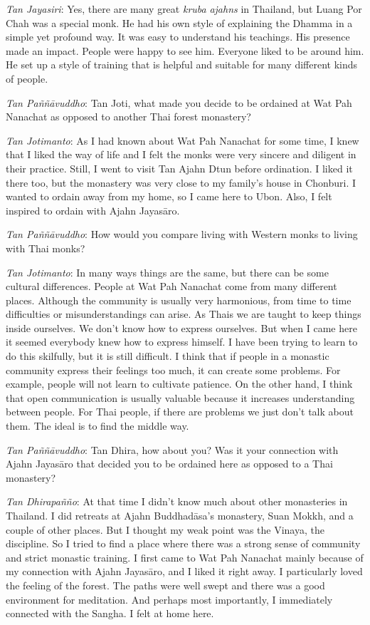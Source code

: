 \emph{Tan Jayasiri}: Yes, there are many great \emph{kruba}
\emph{ajahns} in Thailand, but Luang Por Chah was a special monk. He had
his own style of explaining the Dhamma in a simple yet profound way. It
was easy to understand his teachings. His presence made an impact.
People were happy to see him. Everyone liked to be around him. He set up
a style of training that is helpful and suitable for many different
kinds of people.

\emph{Tan Paññāvuddho}‎: Tan Joti, what made you decide to be ordained
at Wat Pah Nanachat as opposed to another Thai forest monastery?

\emph{Tan Jotimanto}: As I had known about Wat Pah Nanachat for some
time, I knew that I liked the way of life and I felt the monks were very
sincere and diligent in their practice. Still, I went to visit Tan Ajahn
Dtun before ordination. I liked it there too, but the monastery was very
close to my family's house in Chonburi. I wanted to ordain away from my
home, so I came here to Ubon. Also, I felt inspired to ordain with Ajahn
Jayasāro.

\emph{Tan Paññāvuddho}‎: How would you compare living with Western monks
to living with Thai monks?

\emph{Tan Jotimanto}: In many ways things are the same, but there can be
some cultural differences. People at Wat Pah Nanachat come from many
different places. Although the community is usually very harmonious,
from time to time difficulties or misunderstandings can arise. As Thais
we are taught to keep things inside ourselves. We don't know how to
express ourselves. But when I came here it seemed everybody knew how to
express himself. I have been trying to learn to do this skilfully, but
it is still difficult. I think that if people in a monastic community
express their feelings too much, it can create some problems. For
example, people will not learn to cultivate patience. On the other hand,
I think that open communication is usually valuable because it increases
understanding between people. For Thai people, if there are problems we
just don't talk about them. The ideal is to find the middle way.

\emph{Tan Paññāvuddho}‎: Tan Dhira, how about you? Was it your
connection with Ajahn Jayasāro that decided you to be ordained here as
opposed to a Thai monastery?

\emph{Tan Dhirapañño}‎: At that time I didn't know much about other
monasteries in Thailand. I did retreats at Ajahn Buddhadāsa's monastery,
Suan Mokkh, and a couple of other places. But I thought my weak point
was the Vinaya, the discipline. So I tried to find a place where there
was a strong sense of community and strict monastic training. I first
came to Wat Pah Nanachat mainly because of my connection with Ajahn
Jayasāro, and I liked it right away. I particularly loved the feeling of
the forest. The paths were well swept and there was a good environment
for meditation. And perhaps most importantly, I immediately connected
with the Sangha. I felt at home here.

